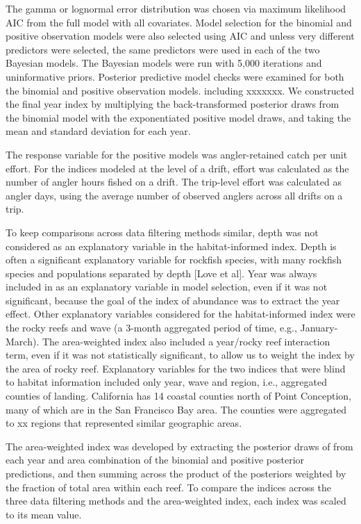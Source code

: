 \documentclass[
  authoryear,
  preprint,
  3p]{elsarticle}
\begin{document}
The gamma or lognormal error distribution was chosen via maximum
likelihood AIC from the full model with all covariates. Model selection
for the binomial and positive observation models were also selected
using AIC and unless very different predictors were selected, the same
predictors were used in each of the two Bayesian models. The Bayesian
models were run with 5,000 iterations and uninformative priors.
Posterior predictive model checks were examined for both the binomial
and positive observation models. including xxxxxxx. We constructed the
final year index by multiplying the back-transformed posterior draws
from the binomial model with the exponentiated positive model draws, and
taking the mean and standard deviation for each year.

The response variable for the positive models was angler-retained catch
per unit effort. For the indices modeled at the level of a drift, effort
was calculated as the number of angler hours fished on a drift. The
trip-level effort was calculated as angler days, using the average
number of observed anglers across all drifts on a trip.

To keep comparisons across data filtering methods similar, depth was not
considered as an explanatory variable in the habitat-informed index.
Depth is often a significant explanatory variable for rockfish species,
with many rockfish species and populations separated by depth {[}Love et
al{]}. Year was always included in as an explanatory variable in model
selection, even if it was not significant, because the goal of the index
of abundance was to extract the year effect. Other explanatory variables
considered for the habitat-informed index were the rocky reefs and wave
(a 3-month aggregated period of time, e.g., January-March). The
area-weighted index also included a year/rocky reef interaction term,
even if it was not statistically significant, to allow us to weight the
index by the area of rocky reef. Explanatory variables for the two
indices that were blind to habitat information included only year, wave
and region, i.e., aggregated counties of landing. California has 14
coastal counties north of Point Conception, many of which are in the San
Francisco Bay area. The counties were aggregated to xx regions that
represented similar geographic areas.

The area-weighted index was developed by extracting the posterior draws
of from each year and area combination of the binomial and positive
posterior predictions, and then summing across the product of the
posteriors weighted by the fraction of total area within each reef. To
compare the indices across the three data filtering methods and the
area-weighted index, each index was scaled to its mean value.
\end{document}
